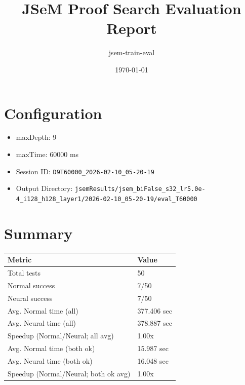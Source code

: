 \documentclass[a4paper,10pt]{article}
\title{JSeM Proof Search Evaluation Report}
\author{jsem-train-eval}
\date{\today}
\begin{document}
\maketitle

\section{Configuration}
\begin{itemize}
\item maxDepth: 9
\item maxTime: 60000 ms
\item Session ID: \texttt{D9T60000\_2026-02-10\_05-20-19}
\item Output Directory: \texttt{jsemResults/jsem\_biFalse\_s32\_lr5.0e-4\_i128\_h128\_layer1/2026-02-10\_05-20-19/eval\_T60000}
\end{itemize}

\section{Summary}
\begin{tabular}{ll}
\toprule
\textbf{Metric} & \textbf{Value} \\
\midrule
Total tests & 50 \\
Normal success & 7/50 \\
Neural success & 7/50 \\
\midrule
Avg. Normal time (all) & 377.406 sec \\
Avg. Neural time (all) & 378.887 sec \\
Speedup (Normal/Neural; all avg) & 1.00x \\
Avg. Normal time (both ok) & 15.987 sec \\
Avg. Neural time (both ok) & 16.048 sec \\
Speedup (Normal/Neural; both ok avg) & 1.00x \\
\bottomrule
\end{tabular}
\end{document}
